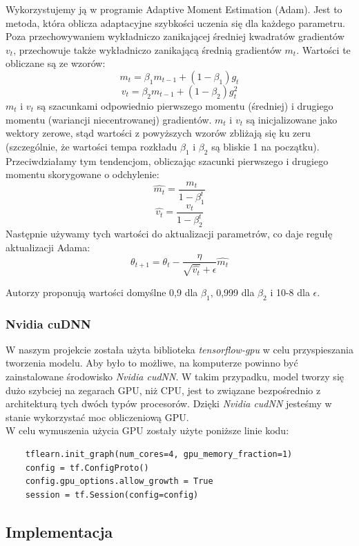 \documentclass[12pt,a4paper]{article}
\begin{document}
    Wykorzystujemy ją w programie Adaptive Moment Estimation (Adam). Jest to metoda, która oblicza adaptacyjne szybkości uczenia się dla każdego parametru. Poza przechowywaniem wykładniczo zanikającej średniej kwadratów gradientów $v_{t}$, przechowuje także wykładniczo zanikającą średnią gradientów $m_{t}$. Wartości te obliczane są ze wzorów:
    $$m_{t}=\beta_{1}m_{t-1}+\left(1-\beta_{1}\right)g_{t}$$
    $$v_{t}=\beta_{2}m_{t-1}+\left(1-\beta_{2}\right)g_{t}^2$$
    $m_{t}$ i $v_{t}$ są szacunkami odpowiednio pierwszego momentu (średniej) i drugiego momentu (wariancji niecentrowanej) gradientów. $m_{t}$ i $v_{t}$ są inicjalizowane jako wektory zerowe, stąd wartości z powyższych wzorów zbliżają się ku zeru (szczególnie, że wartości tempa rozkładu $\beta_{1}$ i $\beta_{2}$ są bliskie 1 na początku).
    \\
    
    Przeciwdziałamy tym tendencjom, obliczając szacunki pierwszego i drugiego momentu skorygowane o odchylenie:
    $$\widehat{m_{t}}=\frac{m_{t}}{1-\beta_{1}^t}$$
    $$\widehat{v_{t}}=\frac{v_{t}}{1-\beta_{2}^t}$$
    Następnie używamy tych wartości do aktualizacji parametrów, co daje regułę aktualizacji Adama:
    $$\theta_{t+1}=\theta_{t}-\frac{\eta}{\sqrt{\widehat{v_{t}}}+\epsilon}\widehat{m_{t}}$$
    
    Autorzy proponują wartości domyślne 0,9 dla $\beta_{1}$, 0,999 dla $\beta_{2}$ i 10-8 dla $\epsilon$.
    
    \subsubsection{Nvidia cuDNN}
    W naszym projekcie została użyta biblioteka \textit{tensorflow-gpu} w celu przyspieszania tworzenia modelu. Aby było to możliwe, na komputerze powinno być zainstalowane środowisko \textit{Nvidia cudNN}. W takim przypadku, model tworzy się dużo szybciej na zegarach GPU, niż CPU, jest to związane bezpośrednio z architekturą tych dwóch typów procesorów. Dzięki \textit{Nvidia cudNN} jesteśmy w stanie wykorzystać moc obliczeniową GPU. \\
    W celu wymuszenia użycia GPU zostały użyte poniższe linie kodu:
    \begin{verbatim}
    tflearn.init_graph(num_cores=4, gpu_memory_fraction=1)
    config = tf.ConfigProto()
    config.gpu_options.allow_growth = True
    session = tf.Session(config=config)
    \end{verbatim}
    
	\subsection{Implementacja}
\end{document}
